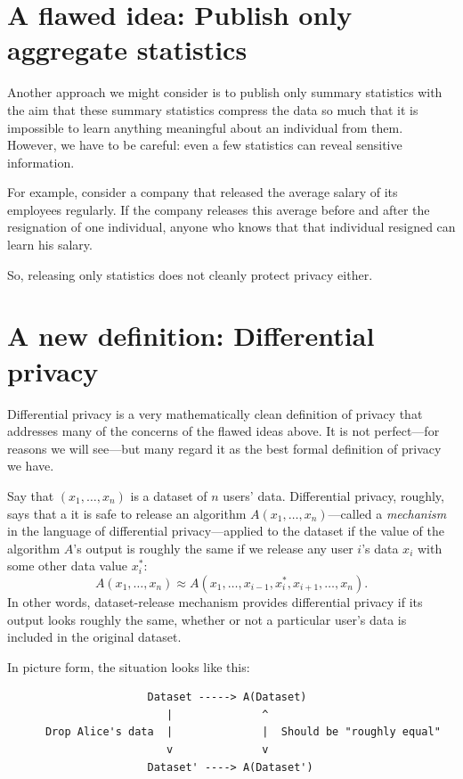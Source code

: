 \documentclass[
  letterpaper,
]{scrbook}
\theoremstyle{definition}
\theoremstyle{plain}
\theoremstyle{plain}
\theoremstyle{remark}
\begin{document}
\section{A flawed idea: Publish only aggregate
statistics}\label{a-flawed-idea-publish-only-aggregate-statistics}

Another approach we might consider is to publish only summary statistics
with the aim that these summary statistics compress the data so much
that it is impossible to learn anything meaningful about an individual
from them. However, we have to be careful: even a few statistics can
reveal sensitive information.

For example, consider a company that released the average salary of its
employees regularly. If the company releases this average before and
after the resignation of one individual, anyone who knows that that
individual resigned can learn his salary.

So, releasing only statistics does not cleanly protect privacy either.

\section{A new definition: Differential privacy}\label{sec-dp-defn}

Differential privacy is a very mathematically clean definition of
privacy that addresses many of the concerns of the flawed ideas above.
It is not perfect---for reasons we will see---but many regard it as the
best formal definition of privacy we have.

Say that \((x_1, \dots, x_n)\) is a dataset of \(n\) users' data.
Differential privacy, roughly, says that a it is safe to release an
algorithm \(A(x_1, \dots, x_n)\)---called a \emph{mechanism} in the
language of differential privacy---applied to the dataset if the value
of the algorithm \(A\)'s output is roughly the same if we release any
user \(i\)'s data \(x_i\) with some other data value \(x^*_i\):
\[ A(x_1, \dots, x_n) \approx A(x_1, \dots, x_{i-1}, x^*_i, x_{i+1}, \dots, x_n). \]
In other words, dataset-release mechanism provides differential privacy
if its output looks roughly the same, whether or not a particular user's
data is included in the original dataset.

In picture form, the situation looks like this:

\begin{verbatim}
                      Dataset -----> A(Dataset)
                         |              ^
      Drop Alice's data  |              |  Should be "roughly equal"
                         v              v
                      Dataset' ----> A(Dataset')
\end{verbatim}
\end{document}

